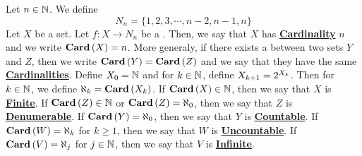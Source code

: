 \newcommand{\Cardinal}[0]{\textbf{\hyperref[def:Cardinality]{Cardinal}}\xspace}
\newcommand{\Cardinals}[0]{\textbf{\hyperref[def:Cardinality]{Cardinals}}\xspace}
\newcommand{\Cardinality}[0]{\textbf{\hyperref[def:Cardinality]{Cardinality}}\xspace}
\newcommand{\Cardinalities}[0]{\textbf{\hyperref[def:Cardinality]{Cardinalities}}\xspace}
\newcommand{\FirstNaturals}[1]{\ensuremath{N_{#1}}\xspace}
\newcommand{\CardinalityFunction}[1]{\ensuremath{\textbf{Card}\pa{#1}\xspace}}
\newcommand{\Finite}[0]{\textbf{\hyperref[def:Cardinality]{Finite}}\xspace}
\newcommand{\Infinite}[0]{\textbf{\hyperref[def:Cardinality]{Infinite}}\xspace}
\newcommand{\Denumerable}[0]{\textbf{\hyperref[def:Cardinality]{Denumerable}}\xspace}
\newcommand{\Countable}[0]{\textbf{\hyperref[def:Cardinality]{Countable}}\xspace}
\newcommand{\Uncountable}[0]{\textbf{\hyperref[def:Cardinality]{Uncountable}}\xspace}
\begin{df}[Cardinality]
\label{def:Cardinality}

\rm
    Let $n \in \mathbb{N}$. We define 
    \begin{equation*}
        \FirstNaturals{n}=\{ 1, 2, 3, \cdots, n-2, n-1, n\}
    \end{equation*}
    Let $X$ be a set.
    Let $f:X \to \FirstNaturals{n}$ 
    be a 
    \Bijection. 
    Then, we say that 
    $X$ has 
    \Cardinality
    $n$
    and we write 
    $\CardinalityFunction{X}=n$.
    More generaly, if there exists a 
    \Bijection
    between two sets 
    $Y$ and $Z$, then we write
    $\CardinalityFunction{Y}=\CardinalityFunction{Z}$
    and we say that they have the same 
    \Cardinalities. 
    Define
    $X_0=\mathbb{N}$
    and for $k \in \mathbb{N}$, define 
    $X_{k+1} = 2^{X_k}$. 
    Then for $k \in \mathbb{N}$, we define 
    $\aleph_k = \CardinalityFunction{X_k}$.
    If $\CardinalityFunction{X} \in \N$, then 
    we say that $X$ is \Finite. 
    If $\CardinalityFunction{Z} \in \N$ or 
    $\CardinalityFunction{Z} = \aleph_0$, 
    then we say that $Z$ is \Denumerable.
    If $\CardinalityFunction{Y} = \aleph_0$, then
    we say that $Y$ is \Countable.
    If $\CardinalityFunction{W}= \aleph_k$ for $k \geq 1$, 
    then we say that $W$ is \Uncountable. 
    If $\CardinalityFunction{V} = \aleph_j$ for $j \in \mathbb{N}$, 
    then we say that $V$ is \Infinite. 


\end{df}



